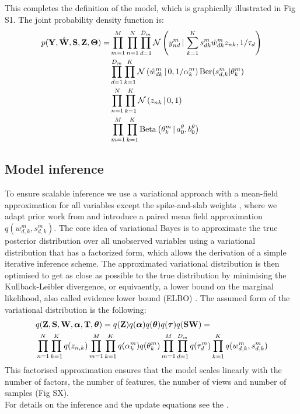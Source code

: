 \documentclass[10pt, a4paper,openany]{report}
\begin{document}
This completes the definition of the model, which is graphically illustrated in Fig S1. The joint probability density function is:
\begin{align}
\begin{split}
p({\bf Y},\hat{{\bf W}},{\bf S},{\bf Z},\mbox{\boldmath $\Theta$})  = &\prod_{m=1}^{M} \prod_{n=1}^{N} \prod_{d=1}^{D_m} \mathcal{N}\left(y_{nd}^m \,|\, \sum_{k=1}^{K} s_{dk}^m \hat{w}_{dk}^m z_{nk},1/\tau_d\right) \\
& \prod_{d=1}^{D_m} \prod_{k=1}^{K} \mathcal{N}\left(\hat{w}_{dk}^m \,|\, 0,1/\alpha_k^m\right) \text{Ber}(s_{d,k}^m|\theta_k^m) \\
& \prod_{n=1}^{N} \prod_{k=1}^{K} \mathcal{N}\left(z_{nk} \,|\, 0,1\right) \\
& \prod_{m=1}^{M} \prod_{k=1}^{K} \text{Beta}\left(\theta_k^m \,|\, a_0^\theta,b_0^\theta\right)
\label{likelihood}
\end{split}
\end{align}

\subsection{Model inference}
To ensure scalable inference we use a variational approach with a mean-field approximation for all variables except the spike-and-slab weights \cite{bishop2006pattern}, where we adapt prior work from \cite{titsias2011spike} and introduce a paired mean field approximation $q(w_{d,k}^m,s_{d,k}^m)$. The core idea of variational Bayes is to approximate the true posterior distribution over all unobserved variables using a variational distribution that has a factorized form, which allows the derivation of a simple iterative inference scheme. The approximated variational distribution is then optimised to get as close as possible to the true distribution by minimising the Kullback-Leibler divergence, or equivaently, a lower bound on the marginal likelihood, also called evidence lower bound (ELBO) \cite{bishop2006pattern}. The assumed form of the variational distribution is the following:
\begin{align*}
&q({\bf Z},{\bf S},{\bf W},\mbox{\boldmath $\alpha$},\mbox{\boldmath $\mathrm{T}$},\mbox{\boldmath $\theta$}) = q({\bf Z})q(\mbox{\boldmath $\alpha$})q(\mbox{\boldmath $\theta$})q(\mbox{\boldmath $\tau$})q({\bf S}{\bf W}) =  \\
&\prod_{n=1}^{N} \prod_{k=1}^{K} q(z_{n,k}) \prod_{m=1}^{M} \prod_{k=1}^{K} q(\alpha_k^m) q(\theta_k^m)
\prod_{m=1}^{M} \prod_{d=1}^{D_m} q(\tau_d^m) \prod_{k=1}^{K} q(w_{d,k}^m,s_{d,k}^m) 
\end{align*}
This factorised approximation ensures that the model scales linearly with the number of factors, the number of features, the number of views and number of samples (Fig SX).\\
For details on the inference and the update equations see the .
\end{document}
